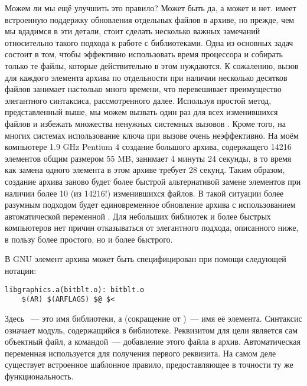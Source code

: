 Можем ли мы ещё улучшить это правило? Может быть да, а может и нет.
\GNUmake{} имеет встроенную поддержку обновления отдельных файлов в
архиве, но прежде, чем мы вдадимся в эти детали, стоит сделать
несколько важных замечаний относительно такого подхода к работе с
библиотеками. Одна из основных задач \GNUmake{} состоит в том, чтобы
эффективно использовать время процессора и собирать только те файлы,
которые действительно в этом нуждаются. К сожалению, вызов
 для каждого элемента архива по отдельности при наличии
несколько десятков файлов занимает настолько много времени, что
перевешивает преимущество элегантного синтаксиса, рассмотренного
далее. Используя простой метод, представленный выше, мы можем вызвать
 один раз для всех изменившихся файлов и избежать
множества ненужных системных вызовов . Кроме того,
на многих системах использование ключа  при вызове
 очень неэффективно. На моём компьютере 1.9 GHz Pentium 4
создание большого архива, содержащего 14216 элементов общим размером
55 MB, занимает 4 минуты 24 секунды, в то время как замена одного
элемента в этом архиве требует 28 секунд. Таким образом, создание
архива заново будет более быстрой альтернативой замене элементов при
наличии более 10 (из 14216!) изменившихся файлов. В такой ситуации
более разумным подходом будет единовременное обновление архива с
использованием автоматической переменной . Для небольших
библиотек и более быстрых компьютеров нет причин отказываться от
элегантного подхода, описанного ниже, в пользу более простого, но и
более быстрого.

В GNU \GNUmake{} элемент архива может быть специфицирован при помощи
следующей нотации:

{\footnotesize
\begin{verbatim}
libgraphics.a(bitblt.o): bitblt.o
    $(AR) $(ARFLAGS) $@ $<
\end{verbatim}
}

Здесь ~--- это имя библиотеки, а
 (сокращение от )~--- имя её элемента. Синтаксис
 означает модуль, содержащийся в
библиотеке. Реквизитом для цели является сам объектный файл, а
командой~--- добавление этого файла в архив. Автоматическая переменная
\variable{\$<} используется для получения первого реквизита. На самом
деле существует встроенное шаблонное правило, предоставляющее в
точности ту же функциональность.

